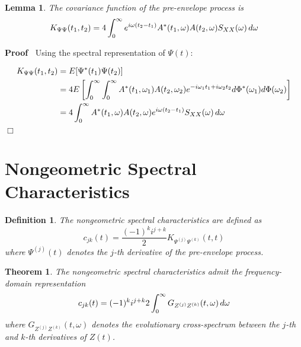 \documentclass{article}
\newenvironment{proof}{\noindent\textbf{Proof\ }}{\hspace*{\fill}$\Box$\medskip}
\newtheorem{definition}{Definition}
\newtheorem{lemma}{Lemma}
\newtheorem{theorem}{Theorem}
\begin{document}
\begin{lemma}
  The covariance function of the pre-envelope process is
  \begin{equation}
    K_{\Psi \Psi} (t_1, t_2) = 4 \int_0^{\infty} e^{i \omega (t_2 - t_1)}
    A^{\ast} (t_1, \omega) A (t_2, \omega) S_{XX} (\omega)  \hspace{0.17em} d
    \omega
  \end{equation}
\end{lemma}

\begin{proof}
  Using the spectral representation of $\Psi (t)$:
  
  \begin{align}
    K_{\Psi \Psi} (t_1, t_2) & = E [\Psi^{\ast} (t_1) \Psi (t_2)] \\
    & = 4 E \left[ \int_0^{\infty} \int_0^{\infty} A^{\ast} (t_1, \omega_1) A
    (t_2, \omega_2) e^{- i \omega_1 t_1 + i \omega_2 t_2} d \Phi^{\ast}
    (\omega_1) d \Phi (\omega_2) \right] \\
    & = 4 \int_0^{\infty} A^{\ast} (t_1, \omega) A (t_2, \omega) e^{i \omega
    (t_2 - t_1)} S_{XX} (\omega)  \hspace{0.17em} d \omega 
  \end{align}
\end{proof}

\section{Nongeometric Spectral Characteristics}

\begin{definition}
  The nongeometric spectral characteristics are defined as
  \begin{equation}
    c_{jk} (t) = \frac{(- 1)^k i^{j + k}}{2} K_{\Psi^{(j)} \Psi^{(k)}} (t, t)
  \end{equation}
  where $\Psi^{(j)} (t)$ denotes the $j$-th derivative of the pre-envelope
  process.
\end{definition}

\begin{theorem}
  The nongeometric spectral characteristics admit the frequency-domain
  representation
  \begin{equation}
    c_{jk} (t) = (- 1)^k i^{j + k} 2 \int_0^{\infty} G_{Z^{(j)} Z^{(k)}} (t,
    \omega)  \hspace{0.17em} d \omega
  \end{equation}
  where $G_{Z^{(j)} Z^{(k)}} (t, \omega)$ denotes the evolutionary
  cross-spectrum between the $j$-th and $k$-th derivatives of $Z (t)$.
\end{theorem}
\end{document}
